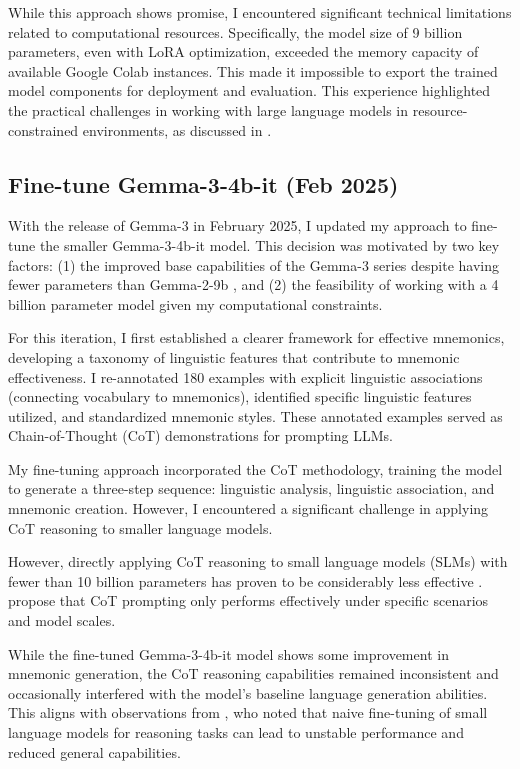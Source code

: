 While this approach shows promise, I encountered significant technical limitations related to computational resources. Specifically, the model size of 9 billion parameters, even with LoRA optimization, exceeded the memory capacity of available Google Colab instances. This made it impossible to export the trained model components for deployment and evaluation. This experience highlighted the practical challenges in working with large language models in resource-constrained environments, as discussed in \citet{dettmersQLoRAEfficientFinetuning2023}.

\subsection{Fine-tune Gemma-3-4b-it (Feb 2025)} \label{app:gemma3-finetune}

With the release of Gemma-3 in February 2025, I updated my approach to fine-tune the smaller Gemma-3-4b-it model. This decision was motivated by two key factors: (1) the improved base capabilities of the Gemma-3 series despite having fewer parameters than Gemma-2-9b \citep{gemma-teamGemma3Technical2025}, and (2) the feasibility of working with a 4 billion parameter model given my computational constraints.

For this iteration, I first established a clearer framework for effective mnemonics, developing a taxonomy of linguistic features that contribute to mnemonic effectiveness. I re-annotated 180 examples with explicit linguistic associations (connecting vocabulary to mnemonics), identified specific linguistic features utilized, and standardized mnemonic styles. These annotated examples served as Chain-of-Thought (CoT) demonstrations for prompting LLMs.

My fine-tuning approach incorporated the CoT methodology, training the model to generate a three-step sequence: linguistic analysis, linguistic association, and mnemonic creation. However, I encountered a significant challenge in applying CoT reasoning to smaller language models.

However, directly applying CoT reasoning to small language models (SLMs) with fewer than 10 billion parameters has proven to be considerably less effective \citep{hoLLMReasoningTeachers2023}. \citet{lanhamMeasuringFaithfulnessChainofThought2023} propose that CoT prompting only performs effectively under specific scenarios and model scales.

While the fine-tuned Gemma-3-4b-it model shows some improvement in mnemonic generation, the CoT reasoning capabilities remained inconsistent and occasionally interfered with the model's baseline language generation abilities. This aligns with observations from \citet{biEnhancingReasoningCapabilities2025a}, who noted that naive fine-tuning of small language models for reasoning tasks can lead to unstable performance and reduced general capabilities.

